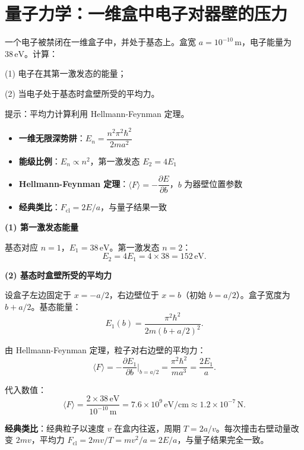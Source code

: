 \section{量子力学：一维盒中电子对器壁的压力}
\label{sec:particle-box-pressure}

\begin{modelbox}[题目：一维无限深势阱中电子对器壁的平均力]
一个电子被禁闭在一维盒子中，并处于基态上。盒宽 $a=10^{-10}\,\text{m}$，电子能量为 $38\,\text{eV}$。计算：

(1) 电子在其第一激发态的能量；

(2) 当电子处于基态时盒壁所受的平均力。

提示：平均力计算利用 Hellmann-Feynman 定理。
\end{modelbox}

\begin{tipbox}[考点快速分析]
\begin{itemize}
    \item \textbf{一维无限深势阱}：$E_n=\dfrac{n^2\pi^2\hbar^2}{2ma^2}$
    \item \textbf{能级比例}：$E_n\propto n^2$，第一激发态 $E_2=4E_1$
    \item \textbf{Hellmann-Feynman 定理}：$\langle F\rangle=-\dfrac{\partial E}{\partial b}$，$b$ 为器壁位置参数
    \item \textbf{经典类比}：$F_{\text{cl}}=2E/a$，与量子结果一致
\end{itemize}
\end{tipbox}

\begin{derivationbox}[标准解题过程]
\textbf{(1) 第一激发态能量}

基态对应 $n=1$，$E_1=38\,\text{eV}$。第一激发态 $n=2$：
\begin{equation}
\boxed{E_2=4E_1=4\times38=152\,\text{eV}.}
\end{equation}

\textbf{(2) 基态时盒壁所受的平均力}

设盒子左边固定于 $x=-a/2$，右边壁位于 $x=b$（初始 $b=a/2$）。盒子宽度为 $b+a/2$。基态能量：
\[
E_1(b)=\frac{\pi^2\hbar^2}{2m(b+a/2)^2}.
\]

由 Hellmann-Feynman 定理，粒子对右边壁的平均力：
\[
\langle F\rangle=-\frac{\partial E_1}{\partial b}\bigg|_{b=a/2}=\frac{\pi^2\hbar^2}{ma^3}=\frac{2E_1}{a}.
\]

代入数值：
\begin{equation}
\boxed{\langle F\rangle=\frac{2\times38\,\text{eV}}{10^{-10}\,\text{m}}=7.6\times10^9\,\text{eV/cm}\approx1.2\times10^{-7}\,\text{N}.}
\end{equation}

\textbf{经典类比}：经典粒子以速度 $v$ 在盒内往返，周期 $T=2a/v$。每次撞击右壁动量改变 $2mv$，平均力 $F_{\text{cl}}=2mv/T=mv^2/a=2E/a$，与量子结果完全一致。
\end{derivationbox}

